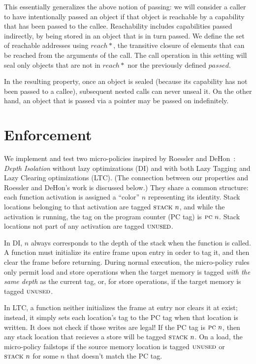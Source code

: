 \documentclass[10pt,conference]{ieeetran}%
\theoremstyle{definition}
\begin{document}
This essentially generalizes the above notion of passing: we will consider
a caller to have intentionally passed an object if that object is reachable by
a capability that has been passed to the callee. Reachability includes capabilities passed
indirectly, by being stored in an object that is in turn passed. We define
the set of reachable addresses using \(\mathit{reach*}\), the transitive closure of elements
that can be reached from the arguments of the call. The call operation in this setting
will seal only objects that are not in \(\mathit{reach*}\) nor the previously defined \(\mathit{passed}\).

In the resulting property, once an object is sealed (because its
capability has not been passed to a callee), subsequent nested calls can never unseal it.
On the other hand, an object that is passed via a pointer may be passed on indefinitely.

\section{Enforcement}
\label{sec:enforcement}

We implement and test two micro-policies inspired by
Roessler and DeHon~\cite{DBLP:conf/sp/RoesslerD18}:
{\em Depth Isolation} without lazy optimizations (DI) and with both
Lazy Tagging and Lazy Clearing optimizations (LTC).
(The connection between our properties and Roessler and DeHon's work is discussed below.)
They share a common structure: each function activation is assigned a ``color'' \(n\)
representing its identity. Stack locations belonging to that activation are
tagged \(\textsc{stack} ~ n\), and while the activation is running, the tag on the
program counter (PC tag) is \(\textsc{pc} ~ n\). Stack locations not part of
any activation are tagged \(\textsc{unused}\).

In DI, \(n\) always corresponds to the depth of the stack when
the function is called. A function must initialize its entire frame upon entry
in order to tag it, and then clear the frame before returning.
During normal execution, the micro-policy rules only permit load and
store operations when the target memory is tagged {\em with the same depth}
as the current {\PCname} tag, or, for store operations, if the target memory
is tagged \(\textsc{unused}\).

In LTC, a function neither initializes the frame at entry nor clears it at exist;
instead, it simply sets each location's tag to the PC tag when that location is written. It does
not check if those writes are legal! If the PC tag is \(\textsc{pc} ~ n\),
then any stack location that recieves a store will be tagged \(\textsc{stack} ~ n\).
On a load, the micro-policy failstops if the source memory location
is tagged \(\textsc{unused}\) or \(\textsc{stack} ~ n\) for some \(n\) that
doesn't match the PC tag.
\end{document}
